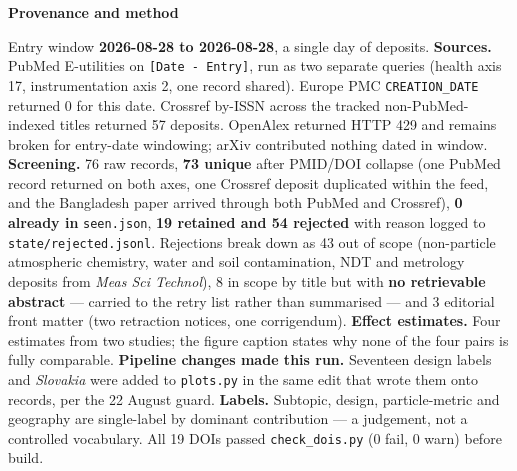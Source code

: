\documentclass[10pt]{article}
\begin{document}


\vspace{4mm}
\begin{keybox}
{\sffamily\bfseries\footnotesize\color{Deep}Provenance and method}\\[1.2mm]
{\fontsize{7.2}{8.8}\selectfont
Entry window \textbf{2026-08-28 to 2026-08-28}, a single day of deposits.
\textbf{Sources.} PubMed E-utilities on \texttt{[Date - Entry]}, run as two separate
queries (health axis 17, instrumentation axis 2, one record shared). Europe PMC
\texttt{CREATION\_DATE} returned 0 for this date. Crossref by-ISSN across the tracked
non-PubMed-indexed titles returned 57 deposits. OpenAlex returned HTTP 429 and remains
broken for entry-date windowing; arXiv contributed nothing dated in window.
\textbf{Screening.} 76 raw records, \textbf{73 unique} after PMID/DOI collapse (one
PubMed record returned on both axes, one Crossref deposit duplicated within the feed, and
the Bangladesh paper arrived through both PubMed and Crossref), \textbf{0 already in}
\texttt{seen.json}, \textbf{19 retained and 54 rejected} with reason logged to
\texttt{state/rejected.jsonl}. Rejections break down as 43 out of scope (non-particle
atmospheric chemistry, water and soil contamination, NDT and metrology deposits from
\textit{Meas Sci Technol}), 8 in scope by title but with \textbf{no retrievable
abstract} --- carried to the retry list rather than summarised --- and 3 editorial front
matter (two retraction notices, one corrigendum).
\textbf{Effect estimates.} Four estimates from two studies; the figure caption states why
none of the four pairs is fully comparable.
\textbf{Pipeline changes made this run.} Seventeen design labels and \textit{Slovakia}
were added to \texttt{plots.py} in the same edit that wrote them onto records, per the
22 August guard.
\textbf{Labels.} Subtopic, design, particle-metric and geography are single-label by
dominant contribution --- a judgement, not a controlled vocabulary. All 19 DOIs passed
\texttt{check\_dois.py} (0 fail, 0 warn) before build.\par}
\end{keybox}
\end{document}
